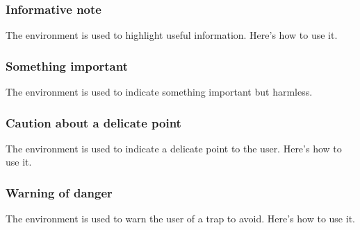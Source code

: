 \subsubsection{Informative note}

The  environment is used to highlight useful information. Here's how to use it.





\subsubsection{Something important}

The  environment is used to indicate something important but harmless.





\subsubsection{Caution about a delicate point}

The  environment is used to indicate a delicate point to the user. Here's how to use it.





\subsubsection{Warning of danger}

The  environment is used to warn the user of a trap to avoid. Here's how to use it.

